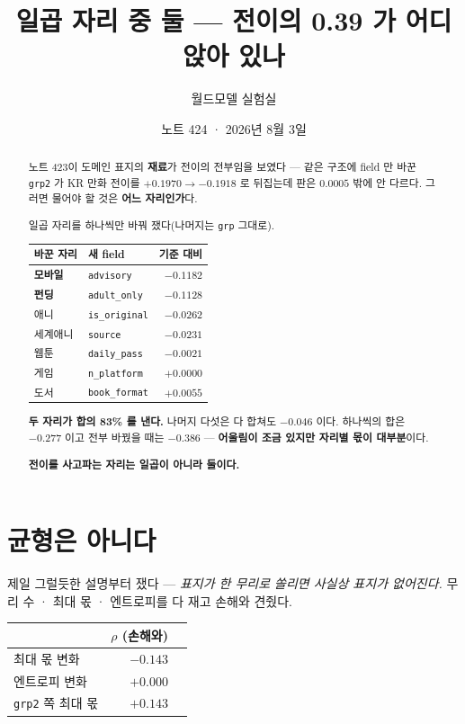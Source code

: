 \documentclass[11pt]{article}
\begin{document}
\title{일곱 자리 중 둘 --- 전이의 0.39 가 어디 앉아 있나}
\author{월드모델 실험실}
\date{노트 424 · 2026년 8월 3일}
\maketitle

\begin{abstract}
노트 423이 도메인 표지의 \textbf{재료}가 전이의 전부임을 보였다 ---
같은 구조에 field 만 바꾼 \texttt{grp2} 가 KR 만화 전이를
$+0.1970 \to -0.1918$ 로 뒤집는데 판은 $0.0005$ 밖에 안 다르다.
그러면 물어야 할 것은 \textbf{어느 자리인가}다.

일곱 자리를 하나씩만 바꿔 쟀다(나머지는 \texttt{grp} 그대로).

\begin{center}
\begin{tabular}{llr}
\hline
바꾼 자리 & 새 field & 기준 대비 \\
\hline
\textbf{모바일} & \texttt{advisory} & $\mathbf{-0.1182}$ \\
\textbf{펀딩} & \texttt{adult\_only} & $\mathbf{-0.1128}$ \\
애니 & \texttt{is\_original} & $-0.0262$ \\
세계애니 & \texttt{source} & $-0.0231$ \\
웹툰 & \texttt{daily\_pass} & $-0.0021$ \\
게임 & \texttt{n\_platform} & $+0.0000$ \\
도서 & \texttt{book\_format} & $+0.0055$ \\
\hline
\end{tabular}
\end{center}

\textbf{두 자리가 합의 83\% 를 낸다.} 나머지 다섯은 다 합쳐도 $-0.046$ 이다.
하나씩의 합은 $-0.277$ 이고 전부 바꿨을 때는 $-0.386$ --- \textbf{어울림이
조금 있지만 자리별 몫이 대부분}이다.

\textbf{전이를 사고파는 자리는 일곱이 아니라 둘이다.}
\end{abstract}

\section{균형은 아니다}

제일 그럴듯한 설명부터 쟀다 --- \emph{표지가 한 무리로 쏠리면 사실상 표지가
없어진다.} 무리 수 · 최대 몫 · 엔트로피를 다 재고 손해와 견줬다.

\begin{center}
\begin{tabular}{lrr}
\hline
 & $\rho$ (손해와) \\
\hline
최대 몫 변화 & $-0.143$ \\
엔트로피 변화 & $+0.000$ \\
\texttt{grp2} 쪽 최대 몫 & $+0.143$ \\
\hline
\end{tabular}
\end{center}
\end{document}
